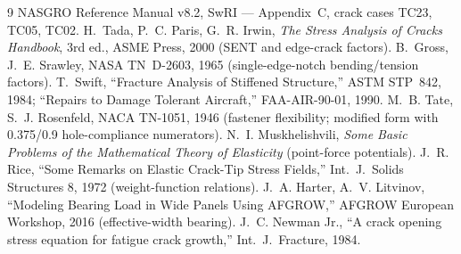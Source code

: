 \documentclass[11pt]{article}
\begin{document}
\begin{thebibliography}{9}
 NASGRO Reference Manual v8.2, SwRI --- Appendix~C, crack cases
  TC23, TC05, TC02.
 H.~Tada, P.~C. Paris, G.~R. Irwin, \emph{The Stress Analysis of
  Cracks Handbook}, 3rd ed., ASME Press, 2000 (SENT and edge-crack factors).
 B.~Gross, J.~E. Srawley, NASA TN~D-2603, 1965 (single-edge-notch
  bending/tension factors).
 T.~Swift, ``Fracture Analysis of Stiffened Structure,'' ASTM
  STP~842, 1984; ``Repairs to Damage Tolerant Aircraft,'' FAA-AIR-90-01, 1990.
 M.~B. Tate, S.~J. Rosenfeld, NACA TN-1051, 1946 (fastener
  flexibility; modified form with 0.375/0.9 hole-compliance numerators).
 N.~I. Muskhelishvili, \emph{Some Basic Problems of the
  Mathematical Theory of Elasticity} (point-force potentials).
 J.~R. Rice, ``Some Remarks on Elastic Crack-Tip Stress Fields,''
  Int.\ J.\ Solids Structures 8, 1972 (weight-function relations).
 J.~A. Harter, A.~V. Litvinov, ``Modeling Bearing Load in Wide
  Panels Using AFGROW,'' AFGROW European Workshop, 2016 (effective-width bearing).
 J.~C. Newman Jr., ``A crack opening stress equation for fatigue
  crack growth,'' Int.\ J.\ Fracture, 1984.
\end{thebibliography}
\end{document}
